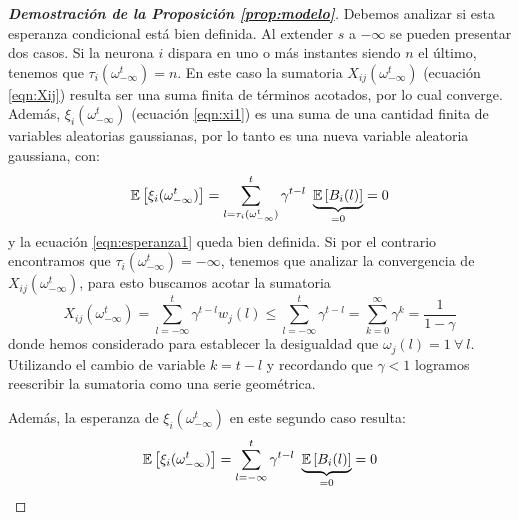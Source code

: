 \begin{proof}[\bf{Demostración de la Proposición \ref{prop:modelo}}]
Debemos analizar si esta esperanza condicional está bien definida. Al extender $s$ a $-\infty$ se pueden presentar dos casos. Si la neurona $i$ dispara en uno o más instantes siendo $n$ el último, tenemos que $\tau_i(\omega_{-\infty}^t) = n$. En este caso la sumatoria $X_{ij}(\omega_{-\infty}^t)$ (ecuación \eqref{eqn:Xij}) resulta ser una suma finita de términos acotados, por lo cual converge. Además, $\xi_i(\omega_{-\infty}^t)$ (ecuación \eqref{eqn:xi1}) es una suma de una cantidad finita de variables aleatorias gaussianas, por lo tanto es una nueva variable aleatoria gaussiana, con:
\begin{equation*}
    \mathbb{E} \left[\xi_i(\omega_{-\infty}^t)\right] = \sum_{l=\tau_i(\omega_{-\infty}^t)}^t \gamma^{t-l} \  \underbrace{\mathbb{E} \left[B_i(l)\right]}_{=0}=0
\end{equation*}
y la ecuación \eqref{eqn:esperanza1} queda bien definida. %
Si por el contrario encontramos que $\tau_i(\omega_{-\infty}^t) = -\infty$, tenemos que analizar la convergencia de $X_{ij}(\omega_{-\infty}^t)$, para esto buscamos acotar la sumatoria
\begin{equation*}
X_{ij}(\omega_{-\infty}^t) = \sum_{l=-\infty}^t \gamma^{t-l} w_j(l) \leq \sum_{l=-\infty}^t \gamma^{t-l} = 
\sum_{k=0}^\infty \gamma^k = \frac{1}{1-\gamma}
\end{equation*}
donde hemos considerado para establecer la desigualdad que $\omega_j(l)=1 \ \forall \ l$. Utilizando el cambio de variable $k=t-l$ y recordando que $\gamma<1$ logramos reescribir la sumatoria como una serie geométrica.
 
Además, la esperanza de $\xi_i(\omega_{-\infty}^t)$ en este segundo caso resulta: 
\begin{equation*}
    \mathbb{E} \left[\xi_i(\omega_{-\infty}^t)\right] = \sum_{l=-\infty}^t \gamma^{t-l} \  \underbrace{\mathbb{E} \left[B_i(l)\right]}_{=0}=0
\end{equation*}


\end{proof}
